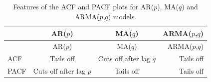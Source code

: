 \documentclass[]{book}
\theoremstyle{definition}
\theoremstyle{definition}
\theoremstyle{definition}
\theoremstyle{remark}
\begin{document}
\begin{longtable}[]{@{}lccr@{}}
\caption{Features of the ACF and PACF plots for AR(\(p\)), MA(\(q\)) and
ARMA(\(p\),\(q\)) models.}\tabularnewline
\toprule
\begin{minipage}[b]{0.17\columnwidth}\raggedright\strut
\strut
\end{minipage} & \begin{minipage}[b]{0.20\columnwidth}\centering\strut
AR(\(p\))\strut
\end{minipage} & \begin{minipage}[b]{0.20\columnwidth}\centering\strut
MA(\(q\))\strut
\end{minipage} & \begin{minipage}[b]{0.20\columnwidth}\raggedleft\strut
ARMA(\(p\),\(q\))\strut
\end{minipage}\tabularnewline
\midrule
\endfirsthead
\toprule
\begin{minipage}[b]{0.17\columnwidth}\raggedright\strut
\strut
\end{minipage} & \begin{minipage}[b]{0.20\columnwidth}\centering\strut
AR(\(p\))\strut
\end{minipage} & \begin{minipage}[b]{0.20\columnwidth}\centering\strut
MA(\(q\))\strut
\end{minipage} & \begin{minipage}[b]{0.20\columnwidth}\raggedleft\strut
ARMA(\(p\),\(q\))\strut
\end{minipage}\tabularnewline
\midrule
\endhead
\begin{minipage}[t]{0.17\columnwidth}\raggedright\strut
ACF\strut
\end{minipage} & \begin{minipage}[t]{0.20\columnwidth}\centering\strut
Tails off\strut
\end{minipage} & \begin{minipage}[t]{0.20\columnwidth}\centering\strut
Cuts off after lag \(q\)\strut
\end{minipage} & \begin{minipage}[t]{0.20\columnwidth}\raggedleft\strut
Tails off\strut
\end{minipage}\tabularnewline
\begin{minipage}[t]{0.17\columnwidth}\raggedright\strut
PACF\strut
\end{minipage} & \begin{minipage}[t]{0.20\columnwidth}\centering\strut
Cuts off after lag \(p\)\strut
\end{minipage} & \begin{minipage}[t]{0.20\columnwidth}\centering\strut
Tails off\strut
\end{minipage} & \begin{minipage}[t]{0.20\columnwidth}\raggedleft\strut
Tails off\strut
\end{minipage}\tabularnewline
\bottomrule
\end{longtable}
\end{document}
